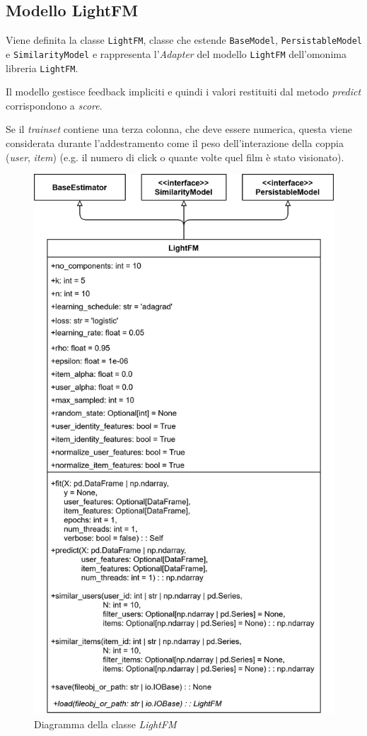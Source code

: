 \subsection{Modello LightFM}
Viene definita la classe \texttt{LightFM}, classe che estende \texttt{BaseModel}, \texttt{PersistableModel} e \texttt{SimilarityModel} e rappresenta l'\textit{Adapter} del modello \texttt{LightFM} dell'omonima libreria \texttt{LightFM}. 

Il modello gestisce feedback impliciti e quindi i valori restituiti dal metodo \textit{predict} corrispondono a \textit{score}.

Se il \textit{trainset} contiene una terza colonna, che deve essere numerica, questa viene considerata durante l'addestramento come il peso dell'interazione della coppia (\textit{user}, \textit{item}) (e.g. il numero di click o quante volte quel film è stato visionato). 

\begin{figure}[H]
    \centering
    \includegraphics[scale=0.2]{figures/UML/models/light_fm.png}
    \caption{Diagramma della classe \textit{LightFM}}
\end{figure}

